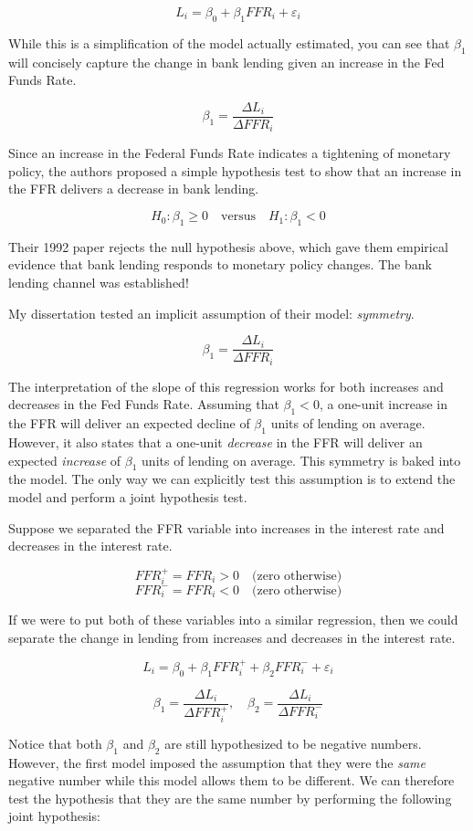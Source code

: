 \documentclass[
]{book}
\begin{document}
\[L_i = \beta_0 + \beta_1 FFR_i + \varepsilon_i\]

While this is a simplification of the model actually estimated, you can see that \(\beta_1\) will concisely capture the change in bank lending given an increase in the Fed Funds Rate.

\[\beta_1 = \frac{\Delta L_i}{\Delta FFR_i}\]

Since an increase in the Federal Funds Rate indicates a tightening of monetary policy, the authors proposed a simple hypothesis test to show that an increase in the FFR delivers a decrease in bank lending.

\[H_0:\beta_1 \geq 0 \quad \text{versus} \quad H_1:\beta_1 < 0\]

Their 1992 paper rejects the null hypothesis above, which gave them empirical evidence that bank lending responds to monetary policy changes. The bank lending channel was established!

My dissertation tested an implicit assumption of their model: \emph{symmetry}.

\[\beta_1 = \frac{\Delta L_i}{\Delta FFR_i}\]

The interpretation of the slope of this regression works for both increases and decreases in the Fed Funds Rate. Assuming that \(\beta_1 <0\), a one-unit increase in the FFR will deliver an expected decline of \(\beta_1\) units of lending on average. However, it also states that a one-unit \emph{decrease} in the FFR will deliver an expected \emph{increase} of \(\beta_1\) units of lending on average. This symmetry is baked into the model. The only way we can explicitly test this assumption is to extend the model and perform a joint hypothesis test.

Suppose we separated the FFR variable into increases in the interest rate and decreases in the interest rate.

\[FFR_i^+ = FFR_i >0 \quad \text{(zero otherwise)}\]
\[FFR_i^- = FFR_i <0 \quad \text{(zero otherwise)}\]

If we were to put both of these variables into a similar regression, then we could separate the change in lending from increases and decreases in the interest rate.

\[L_i = \beta_0 + \beta_1 FFR_i^+ + \beta_2 FFR_i^- + \varepsilon_i\]

\[\beta_1 = \frac{\Delta L_i}{\Delta FFR_i^+}, \quad \beta_2 = \frac{\Delta L_i}{\Delta FFR_i^-}\]

Notice that both \(\beta_1\) and \(\beta_2\) are still hypothesized to be negative numbers. However, the first model imposed the assumption that they were the \emph{same} negative number while this model allows them to be different. We can therefore test the hypothesis that they are the same number by performing the following joint hypothesis:
\end{document}

